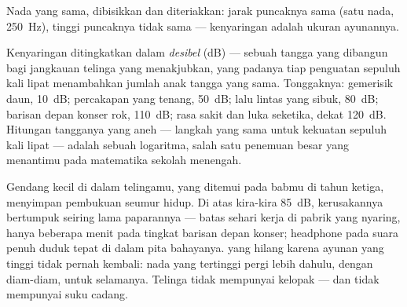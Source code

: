\begin{omfigure}

{\small Nada yang sama, dibisikkan dan diteriakkan: jarak puncaknya
sama (satu nada, \qty{250}{Hz}), tinggi puncaknya tidak sama ---
kenyaringan adalah ukuran ayunannya.}
\end{omfigure}

\begin{example}\label{ex:g8:sound-pitch-loudness:decibels}
Kenyaringan ditingkatkan dalam \emph{desibel}
(\unit{dB}) --- sebuah tangga yang dibangun bagi jangkauan telinga yang
menakjubkan, yang padanya tiap penguatan  sepuluh kali lipat
menambahkan jumlah anak tangga yang sama. Tonggaknya: gemerisik daun,
\qty{10}{dB}; percakapan yang tenang, \qty{50}{dB}; lalu lintas yang
sibuk, \qty{80}{dB}; barisan depan konser rok, \qty{110}{dB}; rasa
sakit dan luka seketika, dekat \qty{120}{dB}. Hitungan tangganya yang
aneh --- langkah yang sama untuk kekuatan sepuluh kali lipat ---
adalah sebuah logaritma, salah satu penemuan besar yang menantimu pada
matematika sekolah menengah.
\end{example}

\begin{remark}\label{rem:g8:sound-pitch-loudness:earsafety}
Gendang kecil di dalam telingamu, yang ditemui pada babmu di tahun
ketiga, menyimpan pembukuan seumur hidup. Di atas kira-kira
\qty{85}{dB}, kerusakannya bertumpuk seiring lama paparannya --- batas
sehari kerja di pabrik yang nyaring, hanya beberapa menit pada tingkat
barisan depan konser; headphone pada suara penuh duduk tepat di dalam
pita bahayanya.  yang hilang karena ayunan yang tinggi
tidak pernah kembali: nada yang tertinggi pergi lebih dahulu, dengan
diam-diam, untuk selamanya. Telinga tidak mempunyai kelopak --- dan
tidak mempunyai suku cadang.
\end{remark}

